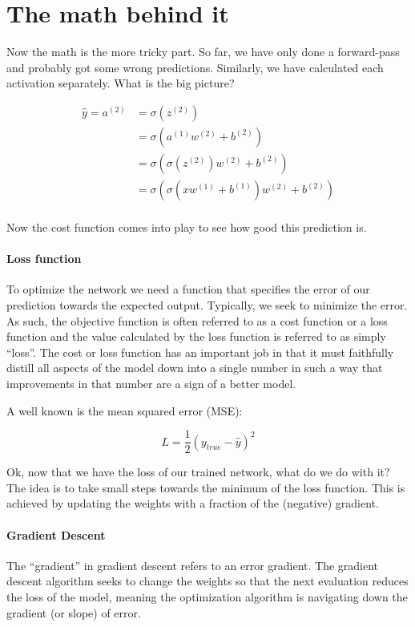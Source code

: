 \section{The math behind it}	
%
%
Now the math is the more tricky part. So far, we have only done a forward-pass and probably got some wrong predictions. Similarly, we have calculated each activation separately. What is the big picture?

\begin{align*}
	\hat{y} = a^{(2)} 	&= \sigma(z^{(2)}) \\
						&= \sigma(a^{(1)}w^{(2)}+b^{(2)}) \\
						&= \sigma(\sigma(z^{(2)})w^{(2)}+b^{(2)}) \\
						&= \sigma(\sigma(xw^{(1)}+b^{(1)})w^{(2)}+b^{(2)}) \\
\end{align*}

Now the cost function comes into play to see how good this prediction is. \\

\paragraph{Loss function}
To optimize the network we need a function that specifies the error of our prediction towards the expected output. Typically, we seek to minimize the error. As such, the objective function is often referred to as a cost function or a loss function and the value calculated by the loss function is referred to as simply “loss”. The cost or loss function has an important job in that it must faithfully distill all aspects of the model down into a single number in such a way that improvements in that number are a sign of a better model.

A well known is the mean squared error (MSE):

$$ L = \frac{1}{2}(y_{true}-\hat{y})^2 $$

Ok, now that we have the loss of our trained network, what do we do with it? The idea is to take small steps towards the minimum of the loss function.
This is achieved by updating the weights with a fraction of the (negative) gradient. \\

\paragraph{Gradient Descent}
The “gradient” in gradient descent refers to an error gradient. The gradient descent algorithm seeks to change the weights so that the next evaluation reduces the loss of the model, meaning the optimization algorithm is navigating down the gradient (or slope) of error. 

